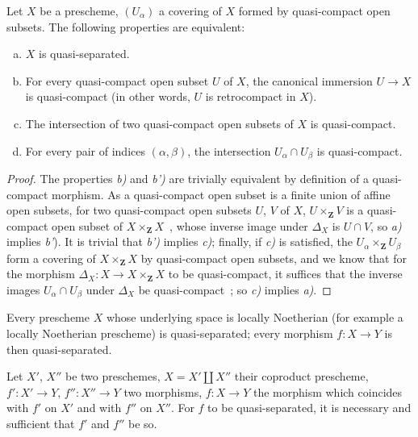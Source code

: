 \begin{proposition}[1.2.7]
\label{IV.1.2.7}
Let $X$ be a prescheme, $(U_\alpha)$ a covering of $X$ formed by quasi-compact open subsets. The following properties are equivalent:
\begin{enumerate}[a)]
  \item $X$ is quasi-separated.
  \item For every quasi-compact open subset $U$ of $X$, the canonical immersion $U\to X$ is quasi-compact
    (in other words, $U$ is retrocompact in $X$).
  \item[b')] The intersection of two quasi-compact open subsets of $X$ is quasi-compact.
  \item For every pair of indices $(\alpha,\beta)$, the intersection $U_\alpha\cap U_\beta$ is quasi-compact.
\end{enumerate}
\end{proposition}

\begin{proof}
The properties \emph{b)} and \emph{b')} are trivially equivalent by definition of a quasi-compact
morphism. As a quasi-compact open subset is a finite union of affine open subsets,
for two quasi-compact open subsets $U$, $V$ of $X$, $U\times_{\mathbf{Z}} V$ is a quasi-compact open subset
of $X\times_{\mathbf{Z}} X$~, whose inverse image under $\Delta_X$ is $U\cap V$, so \emph{a)} implies \emph{b'}).
It is trivial that \emph{b')} implies \emph{c)}; finally, if \emph{c)} is satisfied, the $U_\alpha\times_{\mathbf{Z}} U_\beta$ form a
covering of $X\times_{\mathbf{Z}} X$ by quasi-compact open subsets, and we know that for the
morphism $\Delta_X:X\to X\times_{\mathbf{Z}} X$ to be quasi-compact, it suffices that the inverse images
$U_\alpha\cap U_\beta$ under $\Delta_X$ be quasi-compact~; so \emph{c)} implies \emph{a)}.
\end{proof}

\begin{corollary}[1.2.8]
\label{IV.1.2.8}
Every prescheme $X$ whose underlying space is locally Noetherian
\textnormal{(}for example a locally Noetherian prescheme\textnormal{)} is quasi-separated; every morphism $f:X\to Y$ is
then quasi-separated.
\end{corollary}

\begin{proposition}[1.2.9]
\label{IV.1.2.9}
Let $X'$, $X''$ be two preschemes, $X=X'\coprod X''$ their coproduct prescheme,
$f':X'\to Y$, $f'':X''\to Y$ two morphisms, $f:X\to Y$ the morphism which coincides with $f'$ on $X'$
and with $f''$ on $X''$. For $f$ to be quasi-separated, it is necessary and sufficient that $f'$ and $f''$ be so.
\end{proposition}

